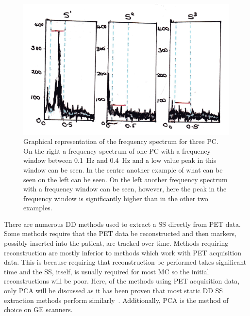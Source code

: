                 \begin{figure}
                    \centering
                        
                    \includegraphics[width=1.0\linewidth]{figures/background_pca_window.png}
                        
                    \captionsetup{singlelinecheck=false, justification=raggedright}
                    \caption{Graphical representation of the frequency spectrum for three \gls{PC}. On the right a frequency spectrum of one \gls{PC} with a frequency window between \SI{0.1}{\hertz} and \SI{0.4}{\hertz} and a low value peak in this window can be seen. In the centre another example of what can be seen on the left can be seen. On the left another frequency spectrum with a frequency window can be seen, however, here the peak in the frequency window is significantly higher than in the other two examples.} \label{fig:data_driven_pca_windoe}
                \end{figure}
                
                There are numerous \gls{DD} methods used to extract a \gls{SS} directly from \gls{PET} data. Some methods require that the \gls{PET} data be reconstructed and then markers, possibly inserted into the patient, are tracked over time. Methods requiring reconstruction are mostly inferior to methods which work with \gls{PET} acquisition data. This is because requiring that reconstruction be performed takes significant time and the \gls{SS}, itself, is usually required for most \gls{MC} so the initial reconstructions will be poor. Here, of the methods using \gls{PET} acquisition data, only \gls{PCA} will be discussed as it has been proven that most static \gls{DD} \gls{SS} extraction methods perform similarly~. Additionally, \gls{PCA} is the method of choice on \gls{GE} scanners.
                
